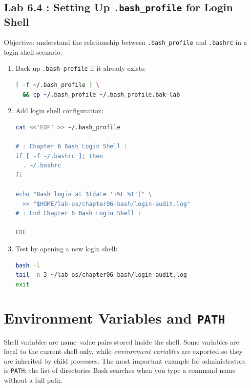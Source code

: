 \subsection*{Lab 6.4 : Setting Up \texttt{.bash\_profile} for Login Shell}

Objective: understand the relationship between \texttt{.bash\_profile} and
\texttt{.bashrc} in a login shell scenario.

\begin{enumerate}
  \item Back up \texttt{.bash\_profile} if it already exists:
\begin{lstlisting}[language=bash, caption={Backing up .bash\_profile if present}]
[ -f ~/.bash_profile ] \
  && cp ~/.bash_profile ~/.bash_profile.bak-lab
\end{lstlisting}

  \item Add login shell configuration:
\begin{lstlisting}[language=bash, caption={Adding configuration to .bash\_profile}]
cat <<'EOF' >> ~/.bash_profile

# : Chapter 6 Bash Login Shell :
if [ -f ~/.bashrc ]; then
  . ~/.bashrc
fi

echo "Bash login at $(date '+%F %T')" \
  >> "$HOME/lab-os/chapter06-bash/login-audit.log"
# : End Chapter 6 Bash Login Shell :

EOF
\end{lstlisting}

  \item Test by opening a new login shell:
\begin{lstlisting}[language=bash, caption={Testing .bash\_profile with a login shell}]
bash -l
tail -n 3 ~/lab-os/chapter06-bash/login-audit.log
exit
\end{lstlisting}
\end{enumerate}

\section{Environment Variables and \texttt{PATH}}
\label{sec:env-variables-path}

Shell variables are name–value pairs stored inside the shell. Some variables
are local to the current shell only, while \textit{environment variables} are
exported so they are inherited by child processes. The most important example
for administrators is \texttt{PATH}: the list of directories Bash searches
when you type a command name without a full path.

